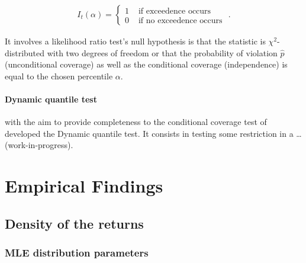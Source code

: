 \documentclass[a4paper, twoside]{templates/ociamthesis}
\begin{document}
\begin{align}
I_{t}(\alpha)=\left\{\begin{array}{ll}
1 & \text { if exceedence occurs } \\
0 & \text { if no exceedence occurs }
\end{array} .\right.
\label{eq:ccov}
\end{align}

\noindent It involves a likelihood ratio test's null hypothesis is that the statistic is \(\chi^2\)-distributed with two degrees of freedom or that the probability of violation \(\hat p\) (unconditional coverage) as well as the conditional coverage (independence) is equal to the chosen percentile \(\alpha\).

\hypertarget{dynamic-quantile-test}{%
\subsubsection{Dynamic quantile test}\label{dynamic-quantile-test}}

\noindent \textcite{engle1999} with the aim to provide completeness to the conditional coverage test of \textcite{christoffersen2001} developed the Dynamic quantile test. It consists in testing some restriction in a \ldots(work-in-progress).

\hypertarget{analysis}{%
\chapter{Empirical Findings}\label{analysis}}

\minitoc 

\hypertarget{density-of-the-returns}{%
\section{Density of the returns}\label{density-of-the-returns}}

\hypertarget{mle-distribution-parameters}{%
\subsection{MLE distribution parameters}\label{mle-distribution-parameters}}
\end{document}
